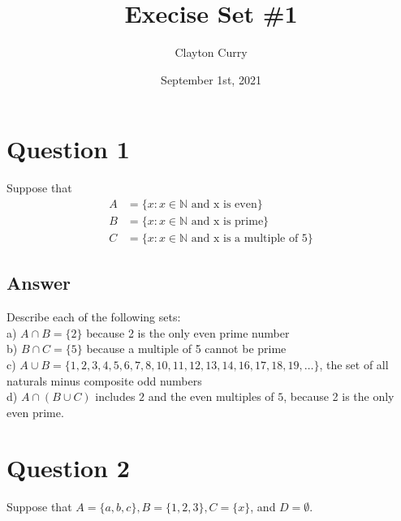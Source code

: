 \documentclass[
	12pt, %
]{fphw}
\title{Execise Set \#1} %
\author{Clayton Curry} %
\date{September 1st, 2021} %
\institute{University of Oklahoma \\ Department of Mathematics} %
\newcommand\set[1]{\{#1\}}
\begin{document}
\maketitle %


\section*{Question 1}

\begin{problem}
Suppose that
\begin{align*}
	A &= \set{x : x \in \mathbb{N} \text{ and x is even}}\\
	B &= \set{x : x \in \mathbb{N} \text{ and x is prime}}\\
	C &= \set{x : x \in \mathbb{N} \text{ and x is a multiple of 5}}
\end{align*}	
\end{problem}


\subsection*{Answer} Describe each of the following sets:\\
a) $A \cap B = \set{2}$   because 2 is the only even prime number\\
b) $B \cap C = \set{5}$ because a multiple of 5 cannot be prime\\
c) $A \cup B = \set{1, 2, 3, 4, 5, 6, 7, 8, 10, 11, 12, 13, 14, 16, 17, 18, 19, \ldots}$, the set of all naturals minus composite odd numbers\\
d) $A \cap (B \cup C)$ includes $2$ and the even multiples of $5$, because 2 is the only even prime.


\section*{Question 2}

\begin{problem}
Suppose that $A = \set{a,b,c}, B = \set{1,2,3}, C = \set{x}$, and $D = \emptyset$.
\end{problem}
\end{document}
